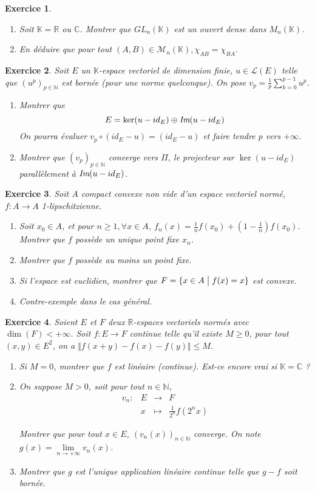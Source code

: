 \documentclass[12pt]{article}
\newtheorem{exercise}{Exercice}[section]
\theoremstyle{remark}
\theoremstyle{remark}
\newcommand{\K}{\mathbb{K}} \newcommand{\R}{\mathbb{R}}
\newcommand{\C}{\mathbb{C}} \newcommand{\Q}{\mathbb{Q}}
\newcommand{\N}{\mathbb{N}} \newcommand{\Z}{\mathbb{Z}}
\newcommand{\M}{\mathcal{M}} \renewcommand{\L}{\mathcal{L}}
\newcommand{\function}[5]{
	$$
	\begin{array}{rccl}
		#1: & #2 & \to & #3 \\
		& #4 & \mapsto & #5
	\end{array}
	$$
}
\begin{document}
\begin{exercise}
	\phantom{}
	\begin{enumerate}
		\item Soit $\K=\R$ ou $\C$. Montrer que $GL_{n}(\K)$ est un ouvert dense dans $M_{n}(\K)$.
		\item En déduire que pour tout $(A,B)\in\M_{n}(\K),\chi_{AB}=\chi_{BA}$.
	\end{enumerate}
\end{exercise}

\begin{exercise}
	Soit $E$ un $\K$-espace vectoriel de dimension finie, $u\in\L(E)$ telle que $(u^{p})_{p\in\N}$ est bornée (pour une norme quelconque). On pose $v_{p}=\frac{1}{p}\sum_{k=0}^{p-1}u^{p}$.
	\begin{enumerate}
		\item Montrer que 
		$$E=\ker(u-id_{E})\oplus\emph{Im}(u-id_{E})$$
		On pourra évaluer $v_{p}\circ(id_{E}-u)=(id_{E}-u)$ et faire tendre $p$ vers $+\infty$.
		\item Montrer que $(v_{p})_{p\in\N}$ converge vers $\Pi$, le projecteur sur $\ker(u-id_{E})$ parallèlement à $\emph{Im}(u-id_{E})$.
	\end{enumerate}
\end{exercise}

\begin{exercise}
	Soit $A$ compact convexe non vide d'un espace vectoriel normé, $f:A\to A$ 1-lipschitzienne.
	\begin{enumerate}
		\item Soit $x_{0}\in A$, et pour $n\geqslant1,\forall x\in A$, $f_{n}(x)=\frac{1}{n}f(x_{0})+(1-\frac{1}{n})f(x_{0})$. Montrer que $f$ possède un unique point fixe $x_{n}$.
		\item Montrer que $f$ possède au moins un point fixe.
		\item Si l'espace est euclidien, montrer que $F=\{x\in A\bigm| f(x)=x\}$ est convexe.
		\item Contre-exemple dans le cas général.
	\end{enumerate}
\end{exercise}

\begin{exercise}
	Soient $E$ et $F$ deux $\R$-espaces vectoriels normés avec $\dim(F)<+\infty$. Soit $f:E\to F$ continue telle qu'il existe $M\geqslant0$, pour tout $(x,y)\in E^{2}$, on a $\Vert f(x+y)-f(x)-f(y)\Vert\leqslant M$.
	\begin{enumerate}
		\item Si $M=0$, montrer que $f$ est linéaire (continue). Est-ce encore vrai si $\K=\C$ ?
		\item On suppose $M>0$, soit pour tout $n\in\N$, \function{v_n}{E}{F}{x}{\frac{1}{2^{n}}f(2^{n}x)}
		Montrer que pour tout $x\in E$, $(v_{n}(x))_{n\in\N}$ converge. On note $g(x)=\lim\limits_{n\to+\infty}v_{n}(x)$.
		\item Montrer que $g$ est l'unique application linéaire continue telle que $g-f$ soit bornée.
	\end{enumerate}
\end{exercise}
\end{document}
